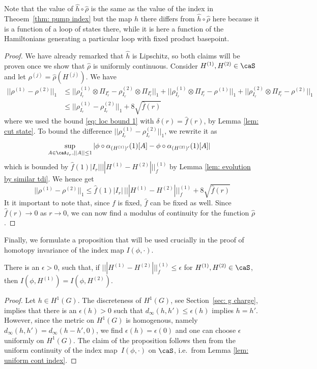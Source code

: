 \noindent Note that the value of $\hat h\circ \hat\rho$ is the same as the value of the index in Theoem~\ref{thm: pump index} but the map $h$ there differs from $\hat h\circ \hat\rho$ here because it is a function of a loop of states there, while it is here a function of the Hamiltonians generating a particular loop with fixed product basepoint.
\begin{proof}
	We have already remarked that $\hat{h}$ is Lipschitz, so both claims will be proven once we show that $\hat{\rho}$ is uniformly continuous. 
	Consider $H^{(1)},H^{(2)}\in \caS$ and let $\rho^{(j)}=\hat{\rho}(H^{(j)})$.
	We have
	\begin{align*}
		||\rho^{(1)}-\rho^{(2)}||_1  &\leq    ||\rho^{(1)}_{I_r} \otimes\Pi_{I_r^c}-\rho^{(2)}_{I_r}\otimes\Pi_{I_r^c}||_1 +  ||\rho^{(1)}_{I_r}\otimes\Pi_{I_r^c}-\rho^{(1)}||_1  +   ||\rho^{(2)}_{I_r}\otimes\Pi_{I_r^c}-\rho^{(2)}||_1 \\
		&\leq  ||\rho^{(1)}_{I_r} -\rho^{(2)}_{I_r}||_1   +  8\sqrt{\hat{f}(r)}
	\end{align*}
	where we used the bound \eqref{eq: loc bound 1} with $\delta(r)=\hat{f}(r)$, by Lemma \ref{lem: cut state}. 
	To bound  the difference
	$||\rho^{(1)}_{I_r} -\rho^{(2)}_{I_r}||_1 $, we rewrite it as
	\begin{align}
		&\sup_{A \in \caA_{I_r}, ||A||\leq 1} |\phi\circ\alpha_{(H^{(1)})'}(1)[A]-\phi\circ\alpha_{(H^{(2)})'}(1)[A]| 
	\end{align}
	which is bounded by $ \hat{f}(1)|I_r| |||H^{(1)}-H^{(2)}|||^{(1)}_f   $ by Lemma \ref{lem: evolution by similar tdi}. 
	We hence get 
	$$
	||\rho^{(1)}-\rho^{(2)}||_1 \leq    \hat{f}(1)|I_r|\, |||H^{(1)}-H^{(2)}|||^{(1)}_f +   8 \sqrt{\hat f(r)}        
	$$
	It it important to note that, since $f$ is fixed, $\hat{f}$ can be fixed as well.  Since $\hat f(r) \to 0$ as $r\to 0$, we can now find a modulus of continuity for the function $\hat{\rho}$.
\end{proof}


Finally, we formulate a proposition that will be used crucially in the proof of homotopy invariance of the index map $I(\phi,\cdot)$. 
\begin{proposition}\label{prop: finite index set}
	There is an $ \epsilon>0$, such that, if $|||H^{(1)}-H^{(2)}|||^{(1)}_f \leq \epsilon$ for $H^{(1)}, H^{(2)}\in\caS$, then $I(\phi,H^{(1)})=I(\phi,H^{(2)})$. 
\end{proposition}
\begin{proof}
	Let $h\in H^1(G)$. The discreteness of $H^1(G)$, see Section~\ref{sec: g charge}, implies that there is an $\epsilon(h)>0$ such that
	$d_{\infty}(h,h')\leq \epsilon(h)$ implies $h=h'$.  However, since the metric on $H^1(G)$ is homogenous, namely $d_{\infty}(h,h') = d_{\infty}(h-h',0)$, we find  $\epsilon(h)=\epsilon(0)$ and one can choose $\epsilon$ uniformly on $H^1(G)$.  The claim of the proposition follows then from the uniform continuity of the index map~$I(\phi,\cdot)$ on $\caS$, i.e.\ from Lemma \ref{lem: uniform cont index}. 
\end{proof}




